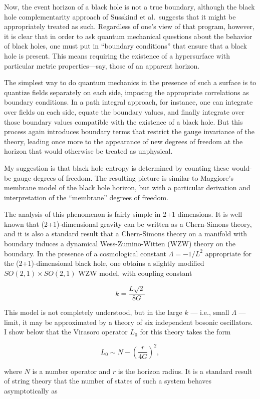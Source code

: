 \documentclass{article}
\begin{document}
Now, the event horizon of a black hole is not a true boundary, although
the black hole complementarity approach of Susskind et al.~suggests that
it might be appropriately treated as such. Regardless of one's view of
that program, however, it is clear that in order to ask quantum
mechanical questions about the behavior of black holes, one must put in
``boundary conditions'' that ensure that a black hole is present. This
means requiring the existence of a hypersurface with particular metric
properties---say, those of an apparent horizon.

The simplest way to do quantum mechanics in the presence of such a
surface is to quantize fields separately on each side, imposing the
appropriate correlations as boundary conditions. In a path integral
approach, for instance, one can integrate over fields on each side,
equate the boundary values, and finally integrate over those boundary
values compatible with the existence of a black hole. But this process
again introduces boundary terms that restrict the gauge invariance of
the theory, leading once more to the appearance of new degrees of
freedom at the horizon that would otherwise be treated as unphysical.

My suggestion is that black hole entropy is determined by counting these
would-be gauge degrees of freedom. The resulting picture is similar to
Maggiore's membrane model of the black hole horizon, but with a
particular derivation and interpretation of the ``membrane'' degrees of
freedom.

The analysis of this phenomenon is fairly simple in 2+1 dimensions. It
is well known that (2+1)-dimensional gravity can be written as a
Chern-Simons theory, and it is also a standard result that a
Chern-Simons theory on a manifold with boundary induces a dynamical
Wess-Zumino-Witten (WZW) theory on the boundary. In the presence of a
cosmological constant \(\Lambda = -1/L^2\) appropriate for the
(2+1)-dimensional black hole, one obtains a slightly modified
\(SO(2,1) \times SO(2,1)\) WZW model, with coupling constant

\[k = \frac{L\sqrt{2}}{8G}\]

This model is not completely understood, but in the large \(k\) ---
i.e., small \(\Lambda\) --- limit, it may be approximated by a theory of
six independent bosonic oscillators. I show below that the Virasoro
operator \(L_0\) for this theory takes the form

\[L_0 \sim N - \left(\frac{r}{4G}\right)^2,\]

where \(N\) is a number operator and \(r\) is the horizon radius. It is
a standard result of string theory that the number of states of such a
system behaves asymptotically as
\end{document}
